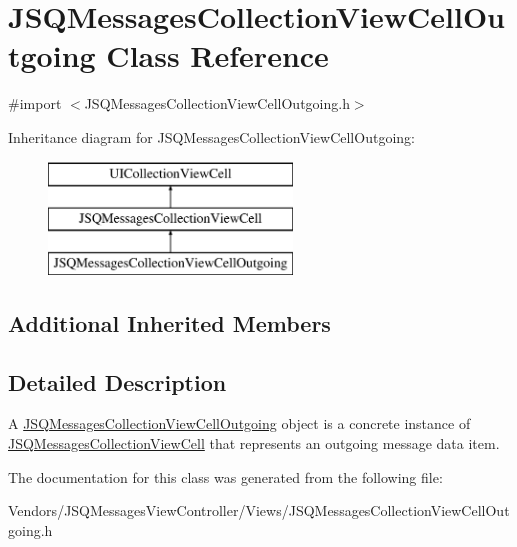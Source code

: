 \hypertarget{interface_j_s_q_messages_collection_view_cell_outgoing}{}\section{J\+S\+Q\+Messages\+Collection\+View\+Cell\+Outgoing Class Reference}
\label{interface_j_s_q_messages_collection_view_cell_outgoing}


{\ttfamily \#import $<$J\+S\+Q\+Messages\+Collection\+View\+Cell\+Outgoing.\+h$>$}

Inheritance diagram for J\+S\+Q\+Messages\+Collection\+View\+Cell\+Outgoing\+:\begin{figure}[H]
\begin{center}
\leavevmode
\includegraphics[height=3.000000cm]{interface_j_s_q_messages_collection_view_cell_outgoing}
\end{center}
\end{figure}
\subsection*{Additional Inherited Members}


\subsection{Detailed Description}
A {\ttfamily \hyperlink{interface_j_s_q_messages_collection_view_cell_outgoing}{J\+S\+Q\+Messages\+Collection\+View\+Cell\+Outgoing}} object is a concrete instance of {\ttfamily \hyperlink{interface_j_s_q_messages_collection_view_cell}{J\+S\+Q\+Messages\+Collection\+View\+Cell}} that represents an outgoing message data item. 

The documentation for this class was generated from the following file\+:\begin{DoxyCompactItemize}
\item 
Vendors/\+J\+S\+Q\+Messages\+View\+Controller/\+Views/J\+S\+Q\+Messages\+Collection\+View\+Cell\+Outgoing.\+h\end{DoxyCompactItemize}

